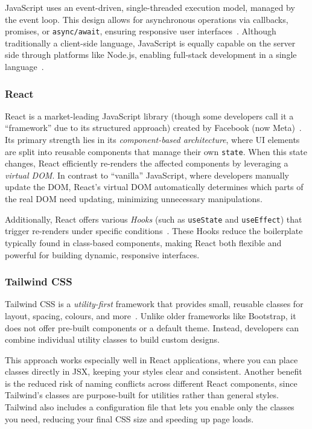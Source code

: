 \documentclass[12pt,a4paper]{article}
\begin{document}
JavaScript uses an event-driven, single-threaded execution model, managed by the event
loop. This design allows for asynchronous operations via callbacks, promises, or \texttt{async/await}, ensuring responsive user interfaces~\cite{KyleSimpsonAsyncJS}. Although traditionally a client-side language, JavaScript is equally capable on the server side through platforms like Node.js, enabling full-stack development in a single language~\cite{nodeDocs}.

\subsubsection*{React}
React is a market-leading JavaScript library (though some developers call it a “framework”
due to its structured approach) created by Facebook (now Meta)~\cite{ReactDocs}. Its primary strength lies in its \emph{component-based architecture}, where UI elements are split into reusable components that manage their own \texttt{state}. When this state changes, React efficiently re-renders the affected components by leveraging a \emph{virtual DOM}. In contrast to “vanilla” JavaScript, where developers manually update the DOM, React’s virtual DOM automatically determines which parts of the real DOM need updating, minimizing unnecessary manipulations.

Additionally, React offers various \textit{Hooks} (such as \texttt{useState} and \texttt{useEffect}) that trigger re-renders under specific conditions~\cite{ReactHooksDocs}. These Hooks reduce the boilerplate typically found in class-based components, making React both flexible and powerful for building dynamic, responsive interfaces.

\subsubsection*{Tailwind CSS}
Tailwind CSS is a \emph{utility-first} framework that provides small, reusable classes for layout, spacing, colours, and more~\cite{TailwindDocs}. Unlike older frameworks like Bootstrap, it does not offer pre-built components or a default theme. Instead, developers can combine individual utility classes to build custom designs.

This approach works especially well in React applications, where you can place classes
directly in JSX, keeping your styles clear and consistent. Another benefit is the reduced risk of naming conflicts across different React components, since Tailwind’s classes are purpose-built for utilities rather than general styles. Tailwind also includes a configuration file that lets you enable only the classes you need, reducing your final CSS size and speeding up page loads.
\end{document}
